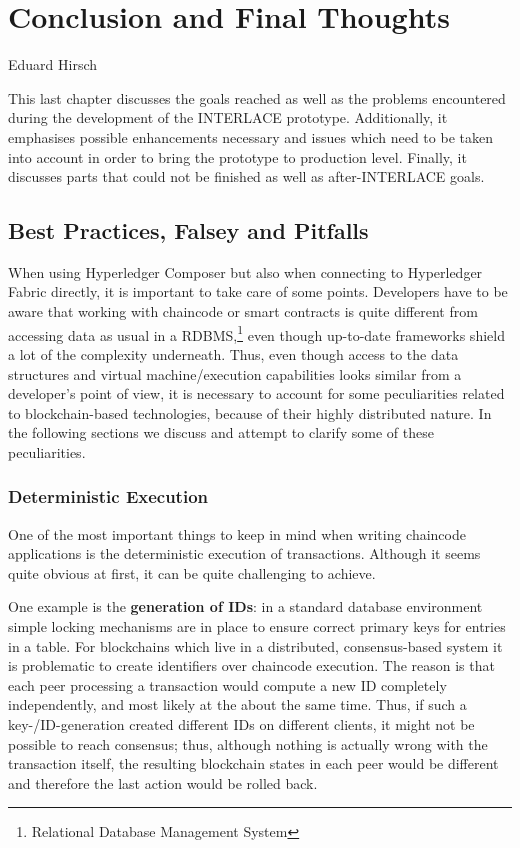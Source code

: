 \chapter{Conclusion and Final Thoughts}
\label{ch:conclusion}

\vspace{-1cm}
\begin{center}
Eduard Hirsch
\end{center}

This last chapter discusses the goals reached as well as the problems encountered during the development of the INTERLACE prototype. Additionally, it emphasises possible enhancements necessary and issues which need to be taken into account in order to bring the prototype to production level. Finally, it discusses parts that could not be finished as well as after-INTERLACE goals.

\section{Best Practices, Falsey and Pitfalls}

When using Hyperledger Composer but also when connecting to Hyperledger Fabric directly, it is important to take care of some points. Developers have to be aware that working with chaincode or smart contracts is quite different from accessing data as usual in a RDBMS,\footnote{Relational Database Management System} even though up-to-date frameworks  shield a lot of the complexity underneath. Thus, even though access to the data structures and virtual machine/execution capabilities looks similar from a developer's point of view, it is necessary to account for some peculiarities related to blockchain-based technologies, because of their highly distributed nature. In the following sections we discuss and attempt to clarify some of these peculiarities.

\subsection{Deterministic Execution}

One of the most important things to keep in mind when writing chaincode applications is the deterministic execution of transactions. Although it seems quite obvious at first, it can be quite challenging to achieve.

One example is the \textbf{generation of IDs}:  in a standard database environment simple locking mechanisms are in place to ensure correct primary keys for entries in a table. For blockchains which live in a distributed, consensus-based system it is problematic to create identifiers over chaincode execution. The reason is that each peer processing a transaction would compute a new ID completely independently, and most likely at the about the same time. Thus, if such a key-/ID-generation created different IDs on different clients, it might not be possible to reach consensus; thus, although nothing is actually wrong with the transaction itself, the resulting blockchain states in each peer would be different and therefore the last action would be rolled back.

